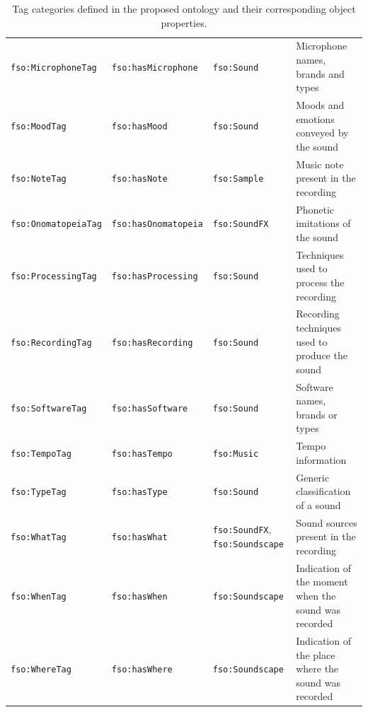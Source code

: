 \begin{table}
\begin{center}
\begin{tabular}{@{}p{3.4cm}lp{4.6cm}l@{}}
\texttt{fso:MicrophoneTag} & \texttt{fso:hasMicrophone} & \texttt{fso:Sound} & Microphone names, brands and types \\
\texttt{fso:MoodTag} & \texttt{fso:hasMood} & \texttt{fso:Sound} & Moods and emotions conveyed by the sound \\
\texttt{fso:NoteTag} & \texttt{fso:hasNote} & \texttt{fso:Sample} & Music note present in the recording \\
\texttt{fso:OnomatopeiaTag} & \texttt{fso:hasOnomatopeia} & \texttt{fso:SoundFX} & Phonetic imitations of the sound \\
\texttt{fso:ProcessingTag} & \texttt{fso:hasProcessing} & \texttt{fso:Sound} & Techniques used to process the recording \\
\texttt{fso:RecordingTag} & \texttt{fso:hasRecording} & \texttt{fso:Sound} & Recording techniques used to produce the sound \\
\texttt{fso:SoftwareTag} & \texttt{fso:hasSoftware} & \texttt{fso:Sound} & Software names, brands or types \\
\texttt{fso:TempoTag} & \texttt{fso:hasTempo} & \texttt{fso:Music} & Tempo information \\
\texttt{fso:TypeTag} & \texttt{fso:hasType} & \texttt{fso:Sound} & Generic classification of a sound \\
\texttt{fso:WhatTag} & \texttt{fso:hasWhat} & \texttt{fso:SoundFX}, \texttt{fso:Soundscape} & Sound sources present in the recording \\
\texttt{fso:WhenTag} & \texttt{fso:hasWhen} & \texttt{fso:Soundscape} & Indication of the moment when the sound was recorded  \\
\texttt{fso:WhereTag} & \texttt{fso:hasWhere} & \texttt{fso:Soundscape} & Indication of the place where the sound was recorded \\
\bottomrule
\end{tabular}
\caption[Tag categories defined in the proposed ontology and their corresponding object properties]{Tag categories defined in the proposed ontology and their corresponding object properties.}
\label{tab:ontology_tag_categories}
\end{center}
\end{table}

